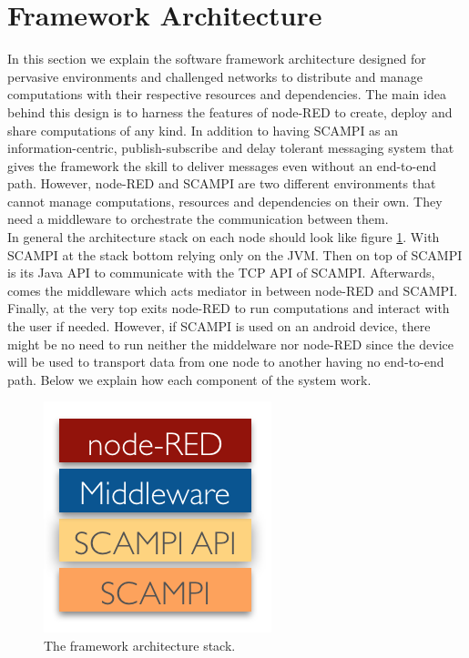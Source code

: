 \section{Framework Architecture}
In this section we explain the software framework architecture designed for pervasive environments and challenged networks to distribute and manage computations with their respective resources and dependencies.  The main idea behind this design is to harness the features of node-RED to create, deploy and share computations of any kind. In addition to having SCAMPI as an information-centric, publish-subscribe and delay tolerant messaging system that gives the framework the skill to deliver messages even without an end-to-end path. However, node-RED and SCAMPI are two different environments that cannot manage computations, resources and dependencies on their own. They need a middleware to orchestrate the communication between them.\\


\noindent In general the architecture stack on each node should look like figure \ref{fig:stack}. With SCAMPI at the stack bottom relying only on the JVM. Then on top of SCAMPI is its Java API to communicate with the TCP API of SCAMPI. Afterwards, comes the middleware which acts mediator in between node-RED and SCAMPI. Finally, at the very top exits node-RED to run computations and interact with the user if needed. However, if SCAMPI is used on an android device, there might be no need to run neither the middelware nor node-RED since the device will be  used to transport data from one node to another having no end-to-end path. Below we explain how each component of the system work.
\begin{figure}[H]
	\centering
	\includegraphics[scale=0.8]{images/stack.png}
	\caption{The framework architecture stack.  }
	\label{fig:stack}
\end{figure}




